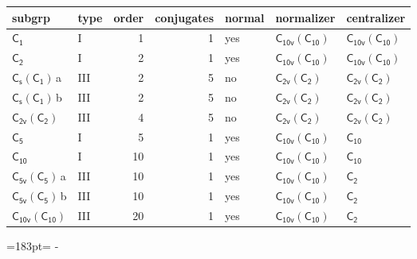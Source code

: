 \documentclass[10pt,a4paper]{article}
\newcommand{\needspace}[1]{\par\penalty-100\begingroup\dimen0=#1\relax\dimen2=\pagegoal
  \advance\dimen2-\pagetotal\ifdim\dimen0>\dimen2\relax\ifdim\dimen2>0pt\vfil\break\fi\fi
  \endgroup}
\numberwithin{equation}{section}
\newcommand{\grp}[1]{\mathsf{#1}}
\newcommand{\clsletter}[1]{\,{\scriptsize\color{black!55}#1}}
\begin{document}
{\small\begin{longtable}{@{}llrrlll@{}}\toprule
subgrp & type & order & conjugates & normal & normalizer & centralizer\\\midrule\endhead
\bottomrule\endfoot\endlastfoot
\href{../../../rotation/data/pdf/C1.pdf}{$\grp{C_{1}}$} & I & 1 & 1 & yes & \href{C10v-C10.pdf}{$\grp{C_{10v}}(\grp{C_{10}})$} & \href{C10v-C10.pdf}{$\grp{C_{10v}}(\grp{C_{10}})$}\\*
\href{../../../rotation/data/pdf/C2.pdf}{$\grp{C_{2}}$} & I & 2 & 1 & yes & \href{C10v-C10.pdf}{$\grp{C_{10v}}(\grp{C_{10}})$} & \href{C10v-C10.pdf}{$\grp{C_{10v}}(\grp{C_{10}})$}\\*
\href{C1v-C1.pdf}{$\grp{C_{s}}(\grp{C_{1}})$}\clsletter{a} & III & 2 & 5 & no & \href{C2v-C2.pdf}{$\grp{C_{2v}}(\grp{C_{2}})$} & \href{C2v-C2.pdf}{$\grp{C_{2v}}(\grp{C_{2}})$}\\*
\href{C1v-C1.pdf}{$\grp{C_{s}}(\grp{C_{1}})$}\clsletter{b} & III & 2 & 5 & no & \href{C2v-C2.pdf}{$\grp{C_{2v}}(\grp{C_{2}})$} & \href{C2v-C2.pdf}{$\grp{C_{2v}}(\grp{C_{2}})$}\\*
\href{C2v-C2.pdf}{$\grp{C_{2v}}(\grp{C_{2}})$} & III & 4 & 5 & no & \href{C2v-C2.pdf}{$\grp{C_{2v}}(\grp{C_{2}})$} & \href{C2v-C2.pdf}{$\grp{C_{2v}}(\grp{C_{2}})$}\\*
\href{../../../rotation/data/pdf/C5.pdf}{$\grp{C_{5}}$} & I & 5 & 1 & yes & \href{C10v-C10.pdf}{$\grp{C_{10v}}(\grp{C_{10}})$} & \href{../../../rotation/data/pdf/C10.pdf}{$\grp{C_{10}}$}\\*
\href{../../../rotation/data/pdf/C10.pdf}{$\grp{C_{10}}$} & I & 10 & 1 & yes & \href{C10v-C10.pdf}{$\grp{C_{10v}}(\grp{C_{10}})$} & \href{../../../rotation/data/pdf/C10.pdf}{$\grp{C_{10}}$}\\*
\href{C5v-C5.pdf}{$\grp{C_{5v}}(\grp{C_{5}})$}\clsletter{a} & III & 10 & 1 & yes & \href{C10v-C10.pdf}{$\grp{C_{10v}}(\grp{C_{10}})$} & \href{../../../rotation/data/pdf/C2.pdf}{$\grp{C_{2}}$}\\*
\href{C5v-C5.pdf}{$\grp{C_{5v}}(\grp{C_{5}})$}\clsletter{b} & III & 10 & 1 & yes & \href{C10v-C10.pdf}{$\grp{C_{10v}}(\grp{C_{10}})$} & \href{../../../rotation/data/pdf/C2.pdf}{$\grp{C_{2}}$}\\*
\href{C10v-C10.pdf}{$\grp{C_{10v}}(\grp{C_{10}})$} & III & 20 & 1 & yes & \href{C10v-C10.pdf}{$\grp{C_{10v}}(\grp{C_{10}})$} & \href{../../../rotation/data/pdf/C2.pdf}{$\grp{C_{2}}$}\\
\bottomrule\end{longtable}}
\needspace{183pt}
\end{document}
